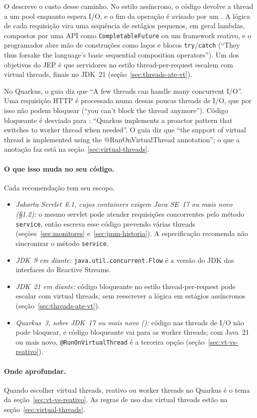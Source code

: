 O  descreve o custo desse caminho. No estilo
assíncrono, o código devolve a thread a um pool enquanto espera I/O, e
o fim da operação é avisado por um . A lógica de cada requisição vira uma sequência de
estágios pequenos, em geral lambdas, compostos por uma API como
\texttt{CompletableFuture} ou um framework reativo, e o programador
abre mão de construções como laços e blocos \texttt{try}/\texttt{catch}
(\enquote{They thus forsake the language's basic sequential composition
operators}). Um dos objetivos do JEP é que servidores no estilo
thread-per-request escalem com virtual threads, finais no JDK~21
(seção~\ref{sec:threads-ate-vt}).

No Quarkus, o guia
 diz que \enquote{A few
threads can handle many concurrent I/O}. Uma requisição HTTP é
processada numa dessas poucas threads de I/O, que por isso não podem
bloquear (\enquote{you can't block the thread anymore}). Código
bloqueante é desviado para : \enquote{Quarkus implements a proactor pattern that
switches to worker thread when needed}. O guia
 diz que \enquote{the support of
virtual thread is implemented using the @RunOnVirtualThread
annotation}; o que a anotação faz está na
seção~\ref{sec:virtual-threads}.

\paragraph{O que isso muda no seu código.}
Cada recomendação tem seu escopo.
\begin{itemize}
\item \emph{Jakarta Servlet~6.1, cujos containers exigem Java SE~17 ou
  mais novo (§1.2):} o mesmo servlet pode atender
  requisições concorrentes pelo método \texttt{service}, então escreva
  esse código prevendo várias threads (seções~\ref{sec:monitores}
  e~\ref{sec:jmm-historia}). A especificação recomenda não
  sincronizar o método \texttt{service}.
\item \emph{JDK~9 em diante:} \texttt{java.util.concurrent.Flow} é a
  versão do JDK das interfaces do Reactive Streams.
\item \emph{JDK~21 em diante:} código bloqueante no estilo
  thread-per-request pode escalar com virtual threads, sem reescrever
  a lógica em estágios assíncronos (seção~\ref{sec:threads-ate-vt}).
\item \emph{Quarkus~3, sobre JDK~17 ou mais novo
  ():} código nas threads de I/O não pode bloquear, e
  código bloqueante vai para as worker threads; com Java~21 ou mais
  novo, \texttt{@RunOnVirtualThread} é a terceira opção
  (seção~\ref{sec:vt-vs-reativo}).
\end{itemize}

\paragraph{Onde aprofundar.}
Quando escolher virtual threads, reativo ou worker threads no Quarkus
é o tema da seção~\ref{sec:vt-vs-reativo}. As regras de uso das
virtual threads estão na seção~\ref{sec:virtual-threads}.
